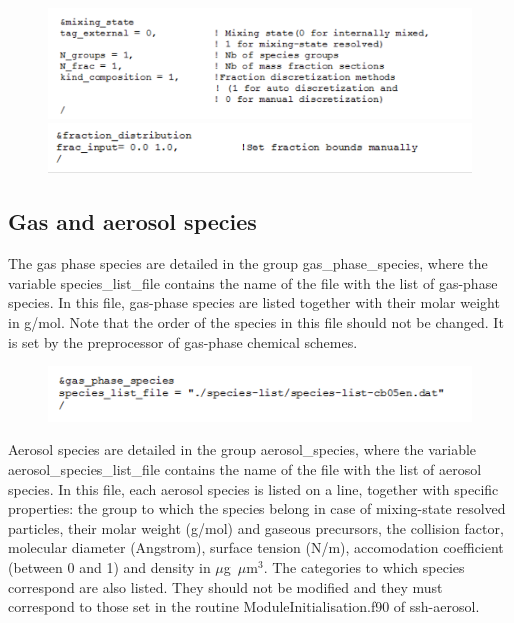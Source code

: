 \documentclass[a4paper,11pt]{article}
\begin{document}
\begin{figure}[H]
        \begin{center}
                \includegraphics[angle=0,width=\textwidth]{fig/mixingstate.png}
                \includegraphics[angle=0,width=\textwidth]{fig/fractiondistribution.png}
       \end{center}
\end{figure}

\subsection{Gas and aerosol species}

The gas phase species are detailed in the group gas\_phase\_species, where the variable species\_list\_file contains the name of the file with the list of gas-phase species.
In this file, gas-phase species are listed together with their molar weight in g/mol. Note that the order of the species in this file should not be changed. It is set by the preprocessor of gas-phase chemical schemes.

\begin{figure}[H]
        \begin{center}
                \includegraphics[angle=0,width=\textwidth]{fig/gasphase.png}
        \end{center}
\end{figure}

Aerosol species are detailed in the group aerosol\_species, where the variable aerosol\_species\_list\_file contains the name of the file with the list of aerosol species.
In this file, each aerosol species is listed on a line, together with specific properties: the group to which the species belong in case of mixing-state resolved particles, their molar weight (g/mol) and gaseous precursors, the collision factor, molecular diameter (Angstrom), surface tension (N/m), accomodation coefficient (between 0 and 1) and density in $\mu$g~$\mu$m$^3$.
The categories to which species correspond are also listed. They should not be modified and they must correspond to those set in the routine ModuleInitialisation.f90 of ssh-aerosol.
\end{document}
